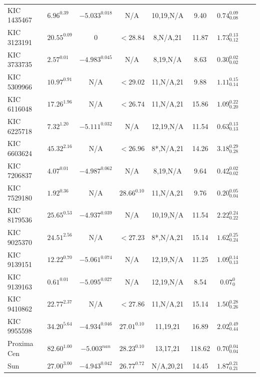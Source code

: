 \begin{appendices}
\begin{landscape}
\begin{longtable}{llccccccl}
KIC 1435467  & $6.96^{0.39}$    & $-5.033^{0.018}$  & N/A               & 10,19,N/A     & 9.40   & $0.74_{0.08}^{0.09}$  \\
KIC 3123191  & $20.55^{0.09}$   & $0$               & $<28.84$          & 8,N/A,21      & 11.87  & $1.73_{0.12}^{0.13}$  \\
KIC 3733735  & $2.57^{0.01}$    & $-4.983^{0.045}$  & N/A               & 8,19,N/A      & 8.63   & $0.30_{0.02}^{0.02}$  \\
KIC 5309966  & $10.97^{0.91}$   & N/A               & $<29.02$          & 11,N/A,21     & 9.88   & $1.11_{0.14}^{0.15}$  \\
KIC 6116048  & $17.26^{1.96}$   & N/A               & $<26.74$          & 11,N/A,21     & 15.86  & $1.09_{0.20}^{0.22}$  \\
KIC 6225718  & $7.32^{1.20}$    & $-5.111^{0.032}$  & N/A               & 12,19,N/A     & 11.54  & $0.63_{0.13}^{0.13}$  \\
KIC 6603624  & $45.32^{2.16}$   & N/A               & $<26.96$          & 8*,N/A,21     & 14.26  & $3.18_{0.28}^{0.29}$  \\
KIC 7206837  & $4.07^{0.01}$    & $-4.987^{0.062}$  & N/A               & 8,19,N/A      & 9.64   & $0.42_{0.02}^{0.02}$  \\
KIC 7529180  & $1.92^{0.36}$    & N/A               & $28.66^{0.10}$    & 11,N/A,21     & 9.76   & $0.20_{0.04}^{0.05}$  \\
KIC 8179536  & $25.65^{0.53}$   & $-4.937^{0.039}$  & N/A               & 10,19,N/A     & 11.54  & $2.22_{0.22}^{0.24}$  \\
KIC 9025370  & $24.51^{2.56}$   & N/A               & $<27.23$          & 8*,N/A,21     & 15.14  & $1.62_{0.24}^{0.25}$  \\
KIC 9139151  & $12.22^{0.70}$   & $-5.061^{0.074}$  & N/A               & 12,19,N/A     & 11.25  & $1.09_{0.13}^{0.14}$  \\
KIC 9139163  & $0.61^{0.01}$    & $-5.095^{0.027}$  & N/A               & 12,19,N/A     & 8.54   & $0.07_{0}^{0}$        \\
KIC 9410862  & $22.77^{2.37}$   & N/A               & $<27.86$          & 11,N/A,21     & 15.14  & $1.50_{0.26}^{0.28}$  \\
KIC 9955598  & $34.20^{5.64}$   & $-4.934^{0.046}$  & $27.01^{0.10}$    & 11,19,21      & 16.89  & $2.02_{0.44}^{0.49}$  \\
Proxima Cen  & $82.60^{1.00}$   & $-5.003^{nan}$    & $28.23^{0.10}$    & 13,17,21      & 118.62 & $0.70_{0.04}^{0.04}$  \\
Sun          & $27.00^{3.00}$   & $-4.943^{0.042}$  & $26.77^{0.72}$    & N/A,20,21     & 14.45  & $1.87_{0.21}^{0.21}$  \\


\end{longtable}
\end{landscape}
\end{appendices}
